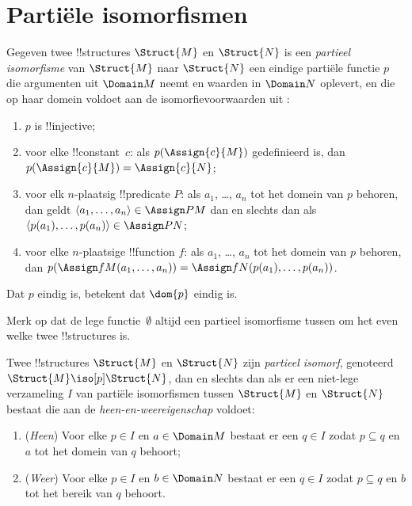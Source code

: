 \documentclass[openany]{memoir}
\begin{document}
\section{Partiële isomorfismen}

\begin{defn}
  Gegeven twee !!{structure}s $\Struct{M}$ en $\Struct{N}$ is een
  \emph{partieel isomorfisme} van $\Struct{M}$ naar $\Struct{N}$ een
  eindige partiële functie $p$ die argumenten uit $\Domain M$ neemt en
  waarden in $\Domain N$ oplevert, en die op haar domein voldoet aan de
  isomorfievoorwaarden uit :
  \begin{enumerate}
  \item $p$ is !!{injective};
  \item voor elke !!{constant}~$c$: als $p(\Assign{c}{M})$ gedefinieerd is,
    dan $p(\Assign{c}{M}) = \Assign{c}{N}$;
  \item voor elk $n$-plaatsig !!{predicate} $P$: als $a_1$, \dots, $a_n$
    tot het domein van $p$ behoren, dan geldt $\langle a_1, \dots, a_n\rangle \in
    \Assign P M$ dan en slechts dan als $\langle p(a_1), \dots, p(a_n) \rangle
    \in \Assign P N$;
  \item voor elke $n$-plaatsige !!{function} $f$: als $a_1$, \dots, $a_n$
    tot het domein van $p$ behoren, dan $p(\Assign f M (a_1, \dots,a_n))
    = \Assign f N (p(a_1), \dots, p(a_n))$.
  \end{enumerate}
  Dat $p$ eindig is, betekent dat $\dom{p}$ eindig is.
\end{defn}

Merk op dat de lege functie~$\emptyset$ altijd een partieel
isomorfisme tussen om het even welke twee !!{structure}s is.

\begin{defn}
  Twee !!{structure}s $\Struct{M}$ en $\Struct{N}$ zijn
  \emph{partieel isomorf}, genoteerd $\Struct{M} \iso[p]
  \Struct{N}$, dan en slechts dan als er een niet-lege verzameling $I$
  van partiële isomorfismen tussen $\Struct{M}$ en $\Struct{N}$ bestaat
  die aan de \emph{heen-en-weereigenschap} voldoet:
  \begin{enumerate}
  \item (\emph{Heen}) Voor elke $p \in I$ en $a \in \Domain M$
    bestaat er een $q \in I$ zodat $p \subseteq q$ en $a$
    tot het domein van $q$ behoort;
  \item (\emph{Weer}) Voor elke $p \in I$ en $b \in \Domain N$
    bestaat er een $q \in I$ zodat $p \subseteq q$ en $b$
    tot het bereik van $q$ behoort.
  \end{enumerate}
\end{defn}
\end{document}

